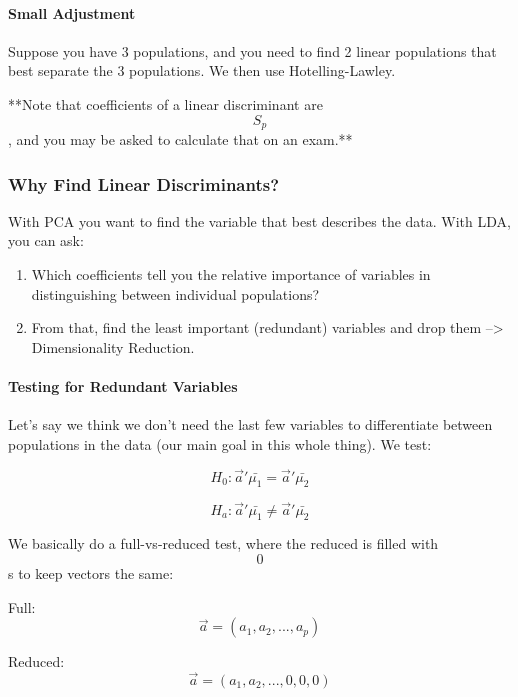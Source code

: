 \documentclass[]{article}
\providecommand{\tightlist}{%
  \setlength{\itemsep}{0pt}\setlength{\parskip}{0pt}}
\let\oldparagraph\paragraph
\renewcommand{\paragraph}[1]{\oldparagraph{#1}\mbox{}}
\begin{document}
\hypertarget{small-adjustment}{%
\paragraph{Small Adjustment}\label{small-adjustment}}

Suppose you have 3 populations, and you need to find 2 linear
populations that best separate the 3 populations. We then use
Hotelling-Lawley.

**Note that coefficients of a linear discriminant are \[S_p\], and you
may be asked to calculate that on an exam.**

\hypertarget{why-find-linear-discriminants}{%
\subsubsection{Why Find Linear
Discriminants?}\label{why-find-linear-discriminants}}

With PCA you want to find the variable that best describes the data.
With LDA, you can ask:

\begin{enumerate}
\def\labelenumi{\arabic{enumi}.}
\tightlist
\item
  Which coefficients tell you the relative importance of variables in
  distinguishing between individual populations?
\item
  From that, find the least important (redundant) variables and drop
  them --\textgreater{} Dimensionality Reduction.
\end{enumerate}

\hypertarget{testing-for-redundant-variables}{%
\paragraph{Testing for Redundant
Variables}\label{testing-for-redundant-variables}}

Let's say we think we don't need the last few variables to differentiate
between populations in the data (our main goal in this whole thing). We
test:

\[H_0: \vec{a}'\bar{\mu_1} = \vec{a}'\bar{\mu_2}\]

\[H_a: \vec{a}'\bar{\mu_1} \ne \vec{a}'\bar{\mu_2}\]

We basically do a full-vs-reduced test, where the reduced is filled with
\[0\]s to keep vectors the same:

Full: \[\vec{a} = (a_1, a_2, ..., a_p)\]

Reduced: \[\vec{a} = (a_1, a_2, ..., 0, 0, 0)\]
\end{document}
